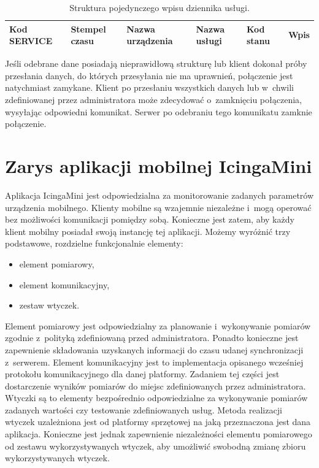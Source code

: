 \begin{table}[H]
\centering
\caption{Struktura pojedynczego wpisu dziennika usługi. }
\begin{tabular}{|p{2cm}|p{2cm}|p{3cm}|p{2cm}|p{1cm}|p{2cm}|}
  \hline
  \raggedright{Kod SERVICE} & \raggedright{Stempel czasu} & \raggedright{Nazwa urządzenia} & \raggedright{Nazwa usługi} & \raggedright{Kod stanu} & Wpis  \\
  \hline
\end{tabular}
\end{table}

Jeśli odebrane dane posiadają nieprawidłową strukturę lub klient
dokonał próby przesłania danych, do których przesyłania nie ma
uprawnień, połączenie jest natychmiast zamykane. Klient po przesłaniu
wszystkich danych lub w~chwili zdefiniowanej przez administratora może
zdecydować o~zamknięciu połączenia, wysyłając odpowiedni
komunikat. Serwer po odebraniu tego komunikatu zamknie połączenie.


\section[IcingaMini][Zarys aplikacji mobilnej IcingaMini]{Zarys aplikacji mobilnej IcingaMini}
\label{sec:IcingaMini}

Aplikacja IcingaMini jest odpowiedzialna za monitorowanie zadanych
parametrów urządzenia mobilnego. Klienty mobilne są wzajemnie
niezależne i~mogą operować bez możliwości komunikacji pomiędzy
sobą. Konieczne jest zatem, aby każdy klient mobilny posiadał swoją
instancję tej aplikacji. Możemy wyróżnić trzy podstawowe, rozdzielne
funkcjonalnie elementy:

\begin{itemize}
\item element pomiarowy,
\item element komunikacyjny,
\item zestaw wtyczek.
\end{itemize}

Element pomiarowy jest odpowiedzialny za planowanie i~wykonywanie
pomiarów zgodnie z~polityką zdefiniowaną przed administratora. Ponadto
konieczne jest zapewnienie składowania uzyskanych informacji do czasu
udanej synchronizacji z~serwerem. Element komunikacyjny jest to
implementacja opisanego wcześniej protokołu komunikacyjnego dla danej
platformy. Zadaniem tej części jest dostarczenie wyników pomiarów do
miejsc zdefiniowanych przez administratora. Wtyczki są to elementy
bezpośrednio odpowiedzialne za wykonywanie pomiarów zadanych wartości
czy testowanie zdefiniowanych usług. Metoda realizacji wtyczek
uzależniona jest od platformy sprzętowej na jaką przeznaczona jest
dana aplikacja. Konieczne jest jednak zapewnienie niezależności
elementu pomiarowego od zestawu wykorzystywanych wtyczek, aby
umożliwić swobodną zmianę zbioru wykorzystywanych wtyczek.


